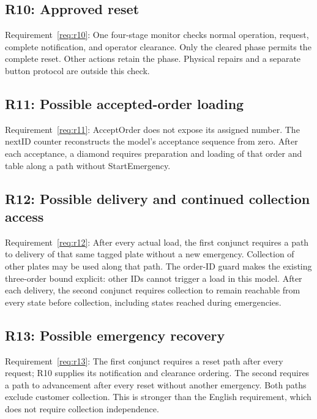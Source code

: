 \documentclass[11pt,a4paper]{article}
\newcommand{\checkedinputs}{../properties}
\begin{document}
\Needspace{390pt}
\subsection{R10: Approved reset}
\label{formula:r10}
Requirement~\ref{req:r10}: One four-stage monitor checks normal operation, request, complete notification, and operator clearance. Only the cleared phase permits the complete reset. Other actions retain the phase. Physical repairs and a separate button protocol are outside this check.


\Needspace{350pt}
\subsection{R11: Possible accepted-order loading}
\label{formula:r11}
Requirement~\ref{req:r11}: AcceptOrder does not expose its assigned number. The nextID counter reconstructs the model's acceptance sequence from zero. After each acceptance, a diamond requires preparation and loading of that order and table along a path without StartEmergency.


\Needspace{360pt}
\subsection{R12: Possible delivery and continued collection access}
\label{formula:r12}
Requirement~\ref{req:r12}: After every actual load, the first conjunct requires a path to delivery of that same tagged plate without a new emergency. Collection of other plates may be used along that path. The order-ID guard makes the existing three-order bound explicit: other IDs cannot trigger a load in this model. After each delivery, the second conjunct requires collection to remain reachable from every state before collection, including states reached during emergencies.


\Needspace{400pt}
\subsection{R13: Possible emergency recovery}
\label{formula:r13}
Requirement~\ref{req:r13}: The first conjunct requires a reset path after every request; R10 supplies its notification and clearance ordering. The second requires a path to advancement after every reset without another emergency. Both paths exclude customer collection. This is stronger than the English requirement, which does not require collection independence.

\end{document}
